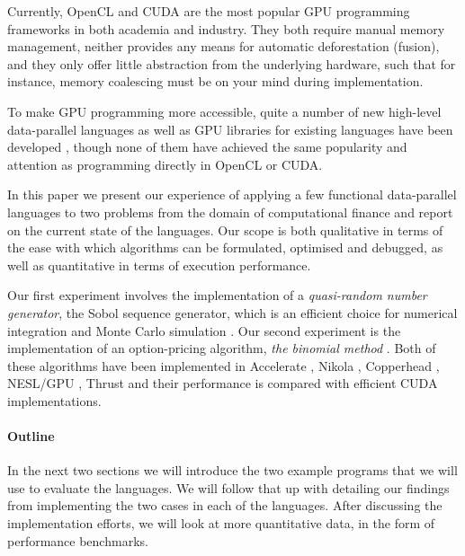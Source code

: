 \documentclass[preprint]{sigplanconf}
\begin{document}
Currently, OpenCL and CUDA are the most popular GPU programming
frameworks in both academia and industry. They both require manual
memory management, neither provides any means for automatic
deforestation (fusion), and they only offer little abstraction from
the underlying hardware, such that for instance, memory coalescing
must be on your mind during implementation.

To make GPU programming more accessible, quite a number of new
high-level data-parallel languages as well as GPU libraries for
existing languages have been developed \cite{Catanzaro2011,
  chakravarty2011accelerating, mainland2010nikola,
  svensson2011obsidian, bergstra2010theano, homepage:rgpu,
  bergstrom2012nested, homepage:bohrium}, though none of them have
achieved the same popularity and attention as programming directly in
OpenCL or CUDA.

In this paper we present our experience of applying a few functional
data-parallel languages to two problems from the domain of
computational finance and report on the current state of the
languages. Our scope is both qualitative in terms of the ease with
which algorithms can be formulated, optimised and debugged, as well as
quantitative in terms of execution performance.

Our first experiment involves the implementation of a
\emph{quasi-random number generator}, the Sobol sequence generator,
which is an efficient choice for numerical integration and Monte Carlo
simulation \cite{acworth1998comparison}. Our second experiment is the
implementation of an option-pricing algorithm, \emph{the binomial
  method} \cite{cox1979option}. Both of these algorithms have been
implemented in Accelerate \cite{chakravarty2011accelerating}, Nikola
\cite{mainland2010nikola}, Copperhead \cite{Catanzaro2011}, NESL/GPU
\cite{bergstrom2012nested}, Thrust \cite{Thrust} and their performance
is compared with efficient CUDA implementations.

\paragraph{Outline} In the next two sections we will introduce the two
example programs that we will use to evaluate the languages. We will
follow that up with detailing our findings from implementing the two
cases in each of the languages. After discussing the implementation
efforts, we will look at more quantitative data, in the form of
performance benchmarks.
\end{document}
